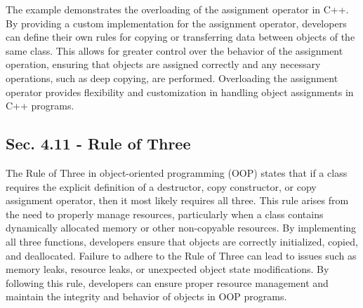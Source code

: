 \begin{solution}
    The example demonstrates the overloading of the assignment operator in C++. By providing a custom implementation for the assignment operator, developers can define their own rules for copying or transferring data between objects of the same class. This allows for greater 
    control over the behavior of the assignment operation, ensuring that objects are assigned correctly and any necessary operations, such as deep copying, are performed. Overloading the assignment operator provides flexibility and customization in handling object assignments in C++ programs.
\end{solution}

\subsection*{Sec. 4.11 - Rule of Three}

The Rule of Three in object-oriented programming (OOP) states that if a class requires the explicit definition of a destructor, copy constructor, or copy assignment operator, then it most likely requires all three. This rule arises from the need to properly manage resources, 
particularly when a class contains dynamically allocated memory or other non-copyable resources. By implementing all three functions, developers ensure that objects are correctly initialized, copied, and deallocated. Failure to adhere to the Rule of Three can lead to issues such as memory leaks, 
resource leaks, or unexpected object state modifications. By following this rule, developers can ensure proper resource management and maintain the integrity and behavior of objects in OOP programs.

